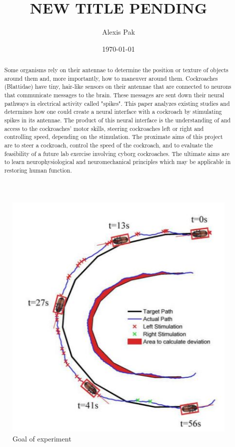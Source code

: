 \documentclass{article}
\title{NEW TITLE PENDING}
\author{Alexis Pak}
\date{\today}
\begin{document}
\maketitle
\begin{abstract}
Some organisms rely on their antennae to determine the position or texture of objects around them and, more importantly, how to maneuver around them. Cockroaches (Blattidae) have tiny, hair-like sensors on their antennae that are connected to neurons that communicate messages to the brain. These messages are sent down their neural pathways in electrical activity called "spikes". This paper analyzes existing studies and determines how one could create a neural interface with a cockroach by stimulating spikes in its antennae. The product of this neural interface is the understanding of and access to the cockroaches' motor skills, steering cockroaches left or right and controlling speed, depending on the stimulation. The proximate aims of this project are to steer a cockroach, control the speed of the cockroach, and to evaluate the feasibility of a future lab exercise involving cyborg cockroaches. The ultimate aims are to learn neurophysiological and neuromechanical principles which may be applicable in restoring human function. 
\end{abstract}

\begin{figure}[ht!]
\centering
\includegraphics[scale=0.5]{Figures/motivation1.JPG}
\caption{Goal of experiment}
\label{fig:motivation1}
\end{figure}
\end{document}
